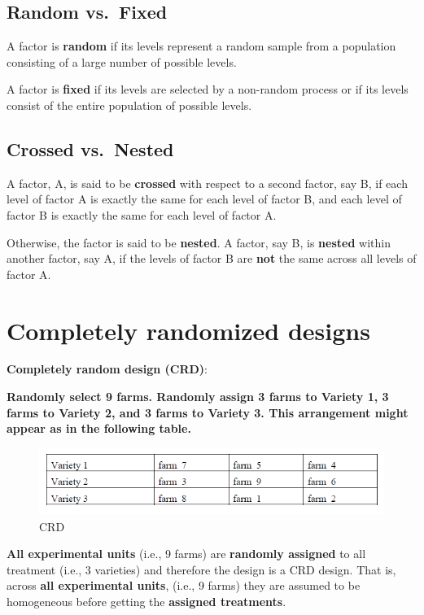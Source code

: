 \documentclass[]{book}
\begin{document}
\hypertarget{random-vs.-fixed}{%
\subsection{Random vs.~Fixed}\label{random-vs.-fixed}}

A factor is \textbf{random} if its levels represent a random sample from a population consisting of a large number of possible levels.

A factor is \textbf{fixed} if its levels are selected by a non-random process or if its levels consist of the entire population of possible levels.

\hypertarget{crossed-vs.-nested}{%
\subsection{Crossed vs.~Nested}\label{crossed-vs.-nested}}

A factor, A, is said to be \textbf{crossed} with respect to a second factor, say B, if each level of factor A is exactly the same for each level of factor B, and each level of factor B is exactly the same for each level of factor A.

Otherwise, the factor is said to be \textbf{nested}. A factor, say B, is \textbf{nested} within another factor, say A, if the levels of factor B are \textbf{not} the same across all levels of factor A.

\hypertarget{completely-randomized-designs}{%
\section{Completely randomized designs}\label{completely-randomized-designs}}

\textbf{Completely random design (CRD)}:

\textbf{Randomly select 9 farms. Randomly assign 3 farms to Variety 1, 3 farms to Variety 2, and 3 farms to Variety 3. This arrangement might appear as in the following table.}

\begin{figure}
\centering
\includegraphics{CRD.png}
\caption{CRD}
\end{figure}

\textbf{All experimental units} (i.e., 9 farms) are \textbf{randomly assigned} to all treatment (i.e., 3 varieties) and therefore the design is a CRD design. That is, across \textbf{all experimental units}, (i.e., 9 farms) they are assumed to be homogeneous before getting the \textbf{assigned treatments}.
\end{document}

